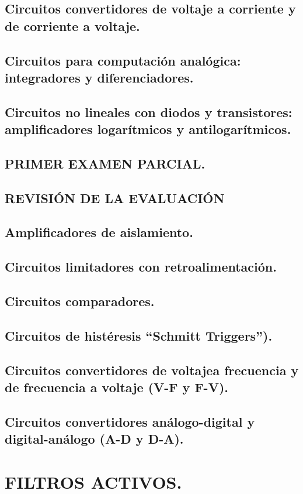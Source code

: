 \documentclass{myarticle}
\begin{document}
\subsection*{Circuitos convertidores de voltaje a corriente y de corriente a voltaje.}
\subsection*{Circuitos para computación analógica: integradores y diferenciadores.}
\subsection*{Circuitos no lineales con diodos y transistores: amplificadores logarítmicos y antilogarítmicos.}
\subsection*{\bf PRIMER EXAMEN PARCIAL.}
\subsection*{\bf REVISIÓN DE LA EVALUACIÓN}
\subsection*{Amplificadores de aislamiento.}
\subsection*{Circuitos limitadores con retroalimentación.}
\subsection*{Circuitos comparadores.}
\subsection*{Circuitos de histéresis ``Schmitt Triggers'').}
\subsection*{Circuitos convertidores de voltajea frecuencia y de frecuencia a voltaje (V-F y F-V).}
\subsection*{Circuitos convertidores análogo-digital y digital-análogo (A-D y D-A).}
\section{ FILTROS ACTIVOS.}
\end{document}
